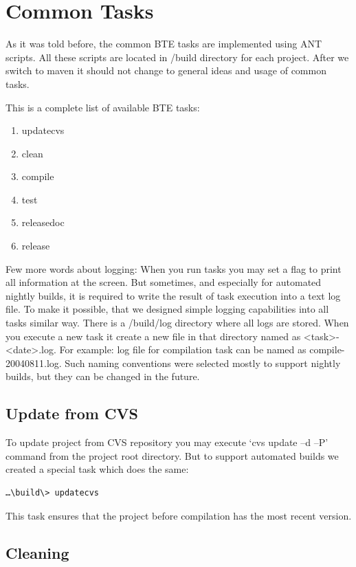 \documentclass[a4paper,12pt,oneside]{book}
\begin{document}
\section{Common Tasks}

As it was told before, the common BTE tasks are implemented using ANT scripts.
All these scripts are located in /build directory for each project.
After we switch to maven it should not change to general ideas and usage of common tasks.

This is a complete list of available BTE tasks:
\begin{enumerate}
  \item updatecvs
	\item clean
	\item compile
	\item test
	\item releasedoc
	\item release
\end{enumerate}

Few more words about logging:
When you run tasks you may set a flag to print all information at the screen.
But sometimes, and especially for automated nightly builds, it is required to write the result of task execution into a text log file.
To make it possible, that we designed simple logging capabilities into all tasks similar way.
There is a /build/log directory where all logs are stored.
When you execute a new task it create a new file in that directory named as \textless task\textgreater-\textless date\textgreater.log.
For example:
log file for compilation task can be named as compile-20040811.log.
Such naming conventions were selected mostly to support nightly builds, but they can be changed in the future.

\subsection{Update from CVS}
To update project from CVS repository you may execute ‘cvs update –d –P’ command from the project root directory.
But to support automated builds we created a special task which does the same:

\begin{verbatim}
…\build\> updatecvs
\end{verbatim}

This task ensures that the project before compilation has the most recent version.

\subsection{Cleaning}
\end{document}
